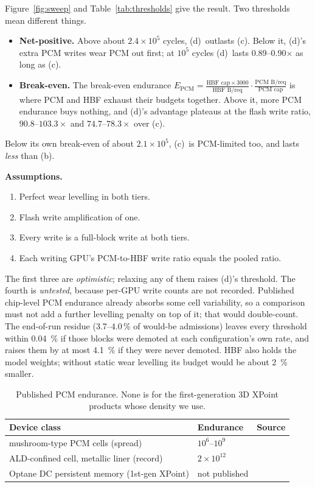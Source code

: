 \documentclass[conference]{IEEEtran}
\newcommand{\cfgb}{\textsf{(b)}}
\newcommand{\cfgc}{\textsf{(c)}}
\newcommand{\cfgd}{\textsf{(d)}}
\begin{document}
Figure~\ref{fig:sweep} and Table~\ref{tab:thresholds} give the result. Two
thresholds mean different things.
\begin{itemize}
  \item \textbf{Net-positive.} Above about $2.4\times10^{5}$ cycles, \cfgd\
        outlasts \cfgc. Below it, \cfgd's extra PCM writes wear PCM out first;
        at $10^{5}$ cycles \cfgd\ lasts 0.89--0.90$\times$ as long as \cfgc.
  \item \textbf{Break-even.} The break-even endurance
        $E_\text{PCM} = \tfrac{\text{HBF cap}\times3000}{\text{HBF B/req}}
        \cdot\tfrac{\text{PCM B/req}}{\text{PCM cap}}$ is where PCM and HBF
        exhaust their budgets together. Above it, more PCM endurance buys
        nothing, and \cfgd's advantage plateaus at the flash write ratio,
        $90.8$--$103.3\times$ and $74.7$--$78.3\times$ over \cfgc.
\end{itemize}
Below its own break-even of about $2.1\times10^{5}$, \cfgc\ is PCM-limited too,
and lasts \emph{less} than \cfgb.

\textbf{Assumptions.}
\begin{enumerate}
  \item Perfect wear levelling in both tiers.
  \item Flash write amplification of one.
  \item Every write is a full-block write at both tiers.
  \item Each writing GPU's PCM-to-HBF write ratio equals the pooled ratio.
\end{enumerate}
The first three are \emph{optimistic}; relaxing any of them raises \cfgd's
threshold. The fourth is \emph{untested}, because per-GPU write counts are not
recorded. Published chip-level PCM endurance already absorbs some cell
variability, so a comparison must not add a further levelling penalty on top of
it; that would double-count. The end-of-run residue (3.7--4.0\,\% of would-be
admissions) leaves every threshold within \SI{0.04}{\percent} if those blocks
were demoted at each configuration's own rate, and raises them by at most
\SI{4.1}{\percent} if they were never demoted. HBF also holds the model
weights; without static wear levelling its budget would be about
\SI{2}{\percent} smaller.

\begin{table}[t]
\centering
\caption{Published PCM endurance. None is for the first-generation 3D XPoint
products whose density we use.}
\label{tab:literature}
\small
\begin{tabular}{p{}p{}l}
\toprule
\textbf{Device class} & \textbf{Endurance} & \textbf{Source} \\
\midrule
mushroom-type PCM cells (spread) & $10^{6}$--$10^{9}$ & \cite{zheng2025natcomm} \\
ALD-confined cell, metallic liner (record) & $2\times10^{12}$ & \cite{kim2016iedm} \\
Optane DC persistent memory (1st-gen XPoint) & not published & \cite{goetze2020pmem} \\
\bottomrule
\end{tabular}
\end{table}
\end{document}
